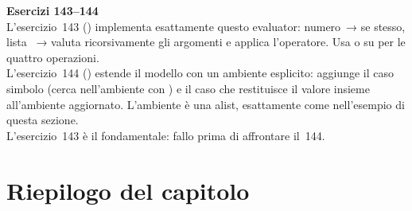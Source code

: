 \begin{workbook}
\textbf{Esercizi 143--144}\\[4pt]
L'esercizio~143 () implementa esattamente
questo evaluator: numero~→ se stesso, lista ~→
valuta ricorsivamente gli argomenti e applica l'operatore.
Usa  o  su  per le quattro operazioni.\\[4pt]
L'esercizio~144 () estende il modello con un ambiente
esplicito: aggiunge il caso simbolo (cerca nell'ambiente con )
e il caso  che restituisce il valore insieme
all'ambiente aggiornato. L'ambiente è una alist, esattamente come
nell'esempio di questa sezione.\\[4pt]
L'esercizio~143 è il fondamentale: fallo prima di affrontare il~144.
\end{workbook}

\section*{Riepilogo del capitolo}

